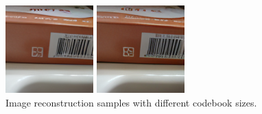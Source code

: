\begin{figure}[h]
\begin{minipage}{0.15\textwidth}
    \end{minipage}
    \begin{minipage}{0.15\textwidth}
        \centering
        \includegraphics[width=\linewidth]{material/65k/374.png}
    \end{minipage}
    \begin{minipage}{0.15\textwidth}
        \centering
        \includegraphics[width=\linewidth]{material/262k/374.png}
    \end{minipage}
    
    \caption{Image reconstruction samples with different codebook sizes.}
\end{figure}

